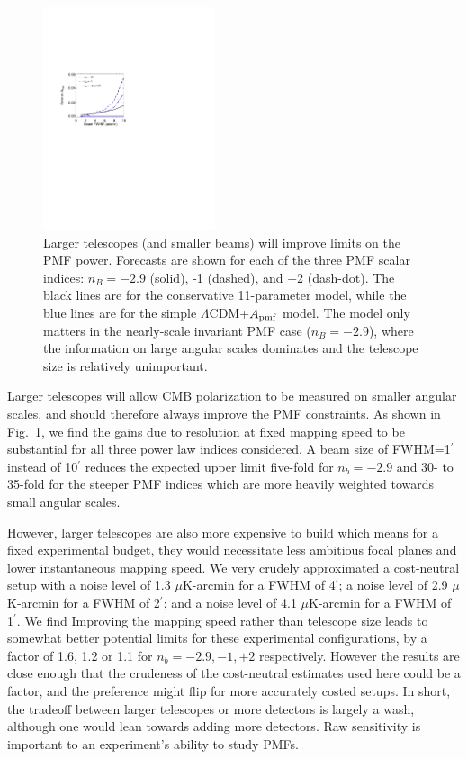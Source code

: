 \documentclass[apj]{emulateapj}
\newcommand{\apmf}{\ensuremath{A_{\rm pmf}}}
\newcommand{\lcdm}{\ensuremath{\Lambda}CDM}
\newcommand{\ukarcmin}{\ensuremath{\mu}K-arcmin}
\begin{document}
\begin{figure}[htb]\centering
\includegraphics[width=0.45\textwidth,clip,trim={1.5cm 12.5cm 11cm 7.5cm}]{pmf_beam.pdf}
  \caption[]{ \label{fig:beam}
 Larger telescopes (and smaller beams) will improve limits on the PMF power. 
 Forecasts are shown for each of the three PMF scalar indices: $n_B = -2.9$ (solid), -1 (dashed), and +2 (dash-dot). 
  The black lines are for the conservative 11-parameter model, while the blue lines are for the simple \lcdm{}+\apmf{} model. 
  The model only matters in the nearly-scale invariant PMF case ($n_B=-2.9$), where the information on large angular scales dominates and the telescope size is relatively unimportant. 
    }
\end{figure}

Larger telescopes will allow CMB polarization to be measured on smaller angular scales, and should therefore always improve the PMF constraints. 
As shown in Fig.~\ref{fig:beam}, we find the gains due to resolution at fixed mapping speed to be substantial for all three power law indices considered.
 A beam size of FWHM=1$^\prime$ instead of 10$^\prime$ reduces the expected upper limit five-fold for $n_b=-2.9$ and 30- to 35-fold for the steeper PMF indices which are more heavily weighted towards small angular scales. 

However, larger telescopes are also more expensive to build which means for a fixed experimental budget, they would necessitate less ambitious focal planes and lower instantaneous mapping speed. 
We very crudely approximated a cost-neutral setup with a noise level of 1.3 \ukarcmin{} for a FWHM of 4$^\prime$; a noise level of 2.9 \ukarcmin{} for a FWHM of 2$^\prime$; and a noise level of 4.1 \ukarcmin{} for a FWHM of 1$^\prime$. 
We find 
Improving the mapping speed rather than telescope size leads to somewhat better potential limits for these experimental configurations, by a factor of 1.6, 1.2 or 1.1 for $n_b = -2.9, -1, +2$ respectively. 
However the results are close enough that the crudeness of the cost-neutral estimates used here could be a factor, and the preference might flip for more accurately costed setups. 
In short,  the tradeoff between larger telescopes or more detectors is largely a wash, although one would lean towards adding more detectors. 
Raw sensitivity is important to an experiment's ability to study PMFs.
\end{document}
